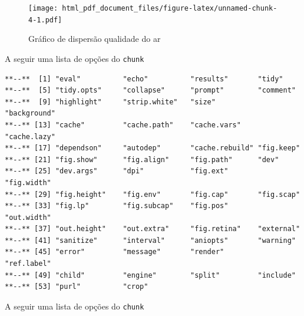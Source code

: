\documentclass[12pt,brazil,]{article}
\newenvironment{Shaded}{\begin{snugshade}}{\end{snugshade}}
\newcommand{\KeywordTok}[1]{\textcolor[rgb]{0.13,0.29,0.53}{\textbf{#1}}}
\newcommand{\NormalTok}[1]{#1}
\newcommand{\OperatorTok}[1]{\textcolor[rgb]{0.81,0.36,0.00}{\textbf{#1}}}
\begin{document}
\begin{figure}
\centering
\texttt{[image: html\_pdf\_document\_files/figure-latex/unnamed-chunk-4-1.pdf]}
\caption{Gráfico de dispersão qualidade do ar}
\end{figure}

A seguir uma lista de opções do \texttt{chunk}

\begin{Shaded}
\end{Shaded}

\begin{verbatim}
**--**  [1] "eval"          "echo"          "results"       "tidy"         
**--**  [5] "tidy.opts"     "collapse"      "prompt"        "comment"      
**--**  [9] "highlight"     "strip.white"   "size"          "background"   
**--** [13] "cache"         "cache.path"    "cache.vars"    "cache.lazy"   
**--** [17] "dependson"     "autodep"       "cache.rebuild" "fig.keep"     
**--** [21] "fig.show"      "fig.align"     "fig.path"      "dev"          
**--** [25] "dev.args"      "dpi"           "fig.ext"       "fig.width"    
**--** [29] "fig.height"    "fig.env"       "fig.cap"       "fig.scap"     
**--** [33] "fig.lp"        "fig.subcap"    "fig.pos"       "out.width"    
**--** [37] "out.height"    "out.extra"     "fig.retina"    "external"     
**--** [41] "sanitize"      "interval"      "aniopts"       "warning"      
**--** [45] "error"         "message"       "render"        "ref.label"    
**--** [49] "child"         "engine"        "split"         "include"      
**--** [53] "purl"          "crop"
\end{verbatim}

A seguir uma lista de opções do \texttt{chunk}

\begin{Shaded}
\end{Shaded}
\end{document}

